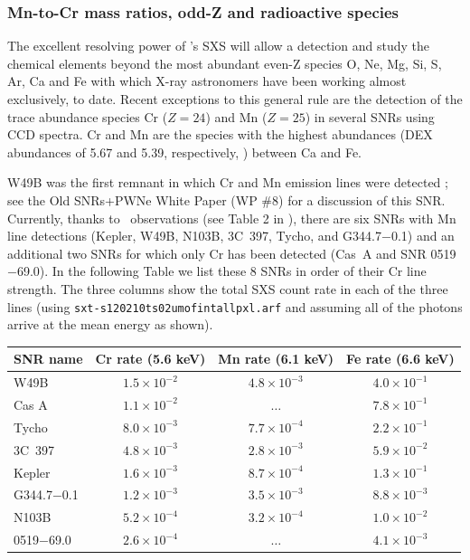 \documentclass[11pt,a4paper]{article}
\begin{document}
\subsubsection{Mn-to-Cr mass ratios, odd-Z and radioactive species}


The excellent resolving power of \ah's SXS will allow a detection 
and study the chemical elements beyond the most abundant even-Z
species O, Ne, Mg, Si, S, Ar, Ca and Fe with which X-ray astronomers
have been working almost exclusively, to date. Recent exceptions to
this general rule are the detection of the trace abundance species Cr
($Z=24$) and Mn ($Z=25$) in several SNRs using CCD spectra. Cr and Mn
are the species with the highest abundances (DEX abundances of 5.67
and 5.39, respectively, \citealt{ag89}) between Ca and Fe.

W49B was the first remnant in which Cr and Mn emission lines were
detected \citep{hwang00b}; see the Old SNRs+PWNe White Paper (WP \#8) for a discussion
of this SNR.  Currently, thanks to \suzaku\ observations
(see Table 2 in \citealt{yang13}), there are six SNRs with Mn line
detections (Kepler, W49B, N103B, 3C~397, Tycho, and G344.7$-$0.1) and
an additional two SNRs for which only Cr has been detected (Cas~A and
SNR 0519$-$69.0).  In the following Table we list these 8 SNRs in
order of their Cr line strength.  The three columns show the total SXS
count rate in each of the three lines (using
{\texttt{sxt-s\underbar{~}120210\underbar{~}ts02um\underbar{~}of\underbar{~}intallpxl.arf}}
and assuming all of the photons arrive at the mean energy as shown).

\begin{center}
\begin{tabular}{|lccc|}  \hline\hline
SNR name     & Cr rate (5.6 keV)    & Mn rate (6.1 keV)    & Fe rate (6.6 keV) \\ \hline
W49B         &   $1.5\times 10^{-2}$ &   $4.8\times 10^{-3}$ &   $4.0\times 10^{-1}$ \\
Cas A        &   $1.1\times 10^{-2}$ &   $\ldots$           &   $7.8\times 10^{-1}$ \\
Tycho        &   $8.0\times 10^{-3}$ &   $7.7\times 10^{-4}$ &   $2.2\times 10^{-1}$ \\
3C~397        &   $4.8\times 10^{-3}$ &   $2.8\times 10^{-3}$ &   $5.9\times 10^{-2}$ \\
Kepler       &   $1.6\times 10^{-3}$ &   $8.7\times 10^{-4}$ &   $1.3\times 10^{-1}$ \\
G344.7$-$0.1 &   $1.2\times 10^{-3}$ &   $3.5\times 10^{-3}$ &   $8.8\times 10^{-3}$ \\
N103B        &   $5.2\times 10^{-4}$ &   $3.2\times 10^{-4}$ &   $1.0\times 10^{-2}$ \\
0519$-$69.0  &   $2.6\times 10^{-4}$ &   $\ldots$           &   $4.1\times 10^{-3}$ \\ \hline\hline
\end{tabular}
\end{center}
\end{document}
